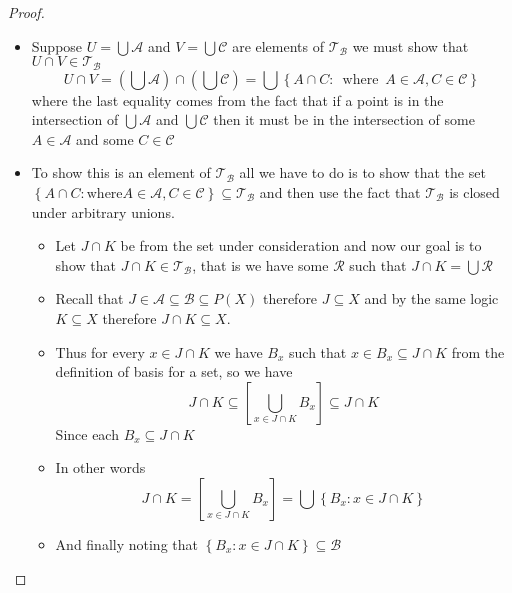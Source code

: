 \begin{proof}
\begin{itemize}
\begin{itemize}
            \item Suppose \(U = \bigcup \mathcal{A} \) and \(V = \bigcup
            \mathcal{C} \) are elements of \(\mathcal{T} _{\mathcal{B}}
            \) we must show that \(U \cap V \in \mathcal{T} _{\mathcal{B}
            } \)
                \[
                U \cap V = \left(\bigcup \mathcal{A}\right) \cap \left(
                \bigcup \mathcal{C}\right) = \bigcup \left\{A \cap C:
                \enspace \text{where} \enspace A \in \mathcal{A}, C \in
                \mathcal{C} \right\}
                \]
                where the last equality comes from the fact that if a point is
                in the intersection of \(\bigcup \mathcal{A} \) and \(\bigcup
                \mathcal{C} \) then it must be in the intersection of some \(A
                \in \mathcal{A} \) and some \(C \in \mathcal{C} \)
            \item To show this is an element of \(\mathcal{T} _{\mathcal{B}
            } \) all we have to do is to show that the set \(\left\{A \cap C:
            \text{where} A \in \mathcal{A}, C \in \mathcal{C}
            \right\} \subseteq \mathcal{T} _{\mathcal{B}} \) and then use
            the fact that \(\mathcal{T} _{\mathcal{B}} \) is closed under
            arbitrary unions.
            \begin{itemize}
                \item Let \(J \cap K \) be from the set under consideration and
                now our goal is to show that \(J \cap K \in \mathcal{T} _{
                \mathcal{B}} \), that is we have some \(\mathcal{R} \) such
                that \(J \cap K = \bigcup \mathcal{R} \)
                \item Recall that \(J \in \mathcal{A} \subseteq \mathcal{B}
                \subseteq P\left(X\right) \) therefore \(J \subseteq X \) and
                by the same logic \(K \subseteq X \) therefore \(J \cap K
                \subseteq X \).
                \item Thus for every \(x \in J \cap K \) we have \(B_{x} \)
                such that \(x \in B_{x} \subseteq J \cap K \) from the
                definition of basis for a set, so we have
                    \[
                    J \cap K \subseteq \left[ \bigcup _{x \in J \cap K} B_{x
                    } \right] \subseteq J \cap K
                    \]
                    Since each \(B_{x} \subseteq J \cap K \)
                \item In other words
                    \[
                    J \cap K = \left[ \bigcup _{x \in J \cap K} B_{x}
                    \right] = \bigcup \left\{B_{x} : x \in J \cap K \right\}
                    \]
                \item And finally noting that \(\left\{B_{x} : x \in J \cap K
                \right\} \subseteq \mathcal{B} \)
            \end{itemize}
        \end{itemize}
    \end{itemize}
\end{proof}
